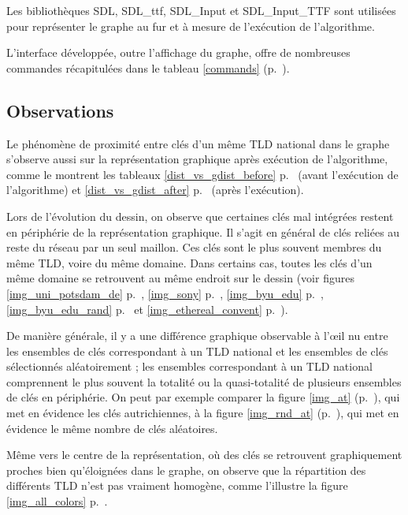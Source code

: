 \documentclass[a4paper]{article}
\begin{document}
Les bibliothèques SDL, SDL\_ttf, SDL\_Input et SDL\_Input\_TTF sont utilisées pour représenter le graphe au fur et à mesure de l'exécution de l'algorithme.

L'interface développée, outre l'affichage du graphe, offre de nombreuses commandes récapitulées dans le tableau \ref{commands} (p.~\pageref{commands}).

\subsection{Observations}

Le phénomène de proximité entre clés d'un même TLD national dans le graphe s'observe aussi sur la représentation graphique après exécution de l'algorithme, comme le montrent les tableaux \ref{dist_vs_gdist_before} p.~\pageref{dist_vs_gdist_before} (avant l'exécution de l'algorithme) et \ref{dist_vs_gdist_after} p.~\pageref{dist_vs_gdist_after} (après l'exécution).

Lors de l'évolution du dessin, on observe que certaines clés mal intégrées restent en périphérie de la représentation graphique. Il s'agit en général de clés reliées au reste du réseau par un seul maillon. Ces clés sont le plus souvent membres du même TLD, voire du même domaine. Dans certains cas, toutes les clés d'un même domaine se retrouvent au même endroit sur le dessin (voir figures \ref{img_uni_potsdam_de} p.~\pageref{img_uni_potsdam_de}, \ref{img_sony} p.~\pageref{img_sony}, \ref{img_byu_edu} p.~\pageref{img_byu_edu}, \ref{img_byu_edu_rand} p.~\pageref{img_byu_edu_rand} et \ref{img_ethereal_convent} p.~\pageref{img_ethereal_convent}).

De manière générale, il y a une différence graphique observable à l'œil nu entre les ensembles de clés correspondant à un TLD national et les ensembles de clés sélectionnés aléatoirement ; les ensembles correspondant à un TLD national comprennent le plus souvent la totalité ou la quasi-totalité de plusieurs ensembles de clés en périphérie. On peut par exemple comparer la figure \ref{img_at} (p.~\pageref{img_at}), qui met en évidence les clés autrichiennes, à la figure \ref{img_rnd_at} (p.~\pageref{img_rnd_at}), qui met en évidence le même nombre de clés aléatoires.

Même vers le centre de la représentation, où des clés se retrouvent graphiquement proches bien qu'éloignées dans le graphe, on observe que la répartition des différents TLD n'est pas vraiment homogène, comme l'illustre la figure \ref{img_all_colors} p.~\pageref{img_all_colors}.
\end{document}
